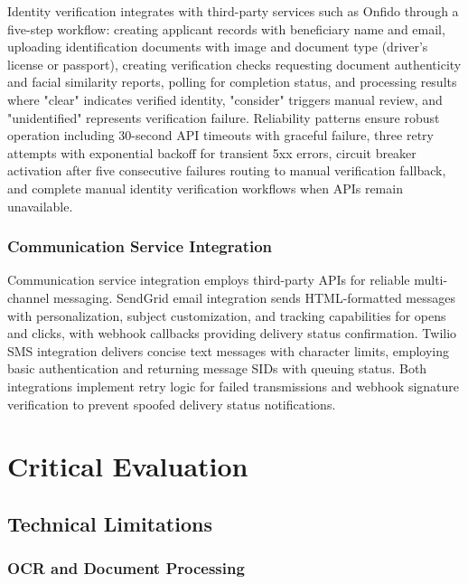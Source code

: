 Identity verification integrates with third-party services such as Onfido through a five-step workflow: creating applicant records with beneficiary name and email, uploading identification documents with image and document type (driver's license or passport), creating verification checks requesting document authenticity and facial similarity reports, polling for completion status, and processing results where "clear" indicates verified identity, "consider" triggers manual review, and "unidentified" represents verification failure. Reliability patterns ensure robust operation including 30-second API timeouts with graceful failure, three retry attempts with exponential backoff for transient 5xx errors, circuit breaker activation after five consecutive failures routing to manual verification fallback, and complete manual identity verification workflows when APIs remain unavailable.

\subsubsection{Communication Service Integration}

Communication service integration employs third-party APIs for reliable multi-channel messaging. SendGrid email integration sends HTML-formatted messages with personalization, subject customization, and tracking capabilities for opens and clicks, with webhook callbacks providing delivery status confirmation. Twilio SMS integration delivers concise text messages with character limits, employing basic authentication and returning message SIDs with queuing status. Both integrations implement retry logic for failed transmissions and webhook signature verification to prevent spoofed delivery status notifications.

\section{Critical Evaluation}\label{sec:critical_evaluation}

\subsection{Technical Limitations}

\subsubsection{OCR and Document Processing}


